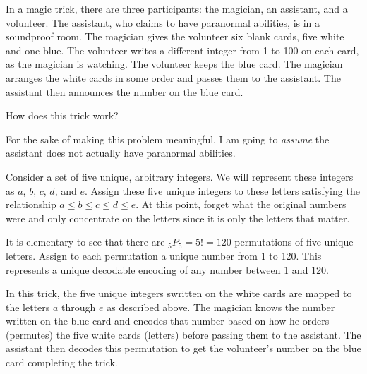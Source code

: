 \newpage
\begin{problem}{15}{5}
  In a magic trick, there are three participants: the magician, an assistant, and a volunteer.  The assistant, who claims to have paranormal abilities, is in a soundproof room.  The magician gives the volunteer six blank cards, five white and one blue.  The volunteer writes a different integer from 1 to 100 on each card, as the magician is watching.  The volunteer keeps the blue card. The magician arranges the white cards in some order and passes them to the assistant. The assistant then announces the number on the blue card.
  
  How does this trick work?
\end{problem}

For the sake of making this problem meaningful, I am going to \textit{assume} the assistant does not actually have paranormal abilities.

Consider a set of five unique, arbitrary integers.  We will represent these integers as $a$, $b$, $c$, $d$, and $e$.  Assign these five unique integers to these letters satisfying the relationship $a \leq b \leq c \leq d \leq e$.  At this point, forget what the original numbers were and only concentrate on the letters since it is only the letters that matter.  

It is elementary to see that there are ${}_{5}P_{5} = 5! = 120$ permutations of five unique letters.  Assign to each permutation a unique number from 1 to 120.  This represents a unique decodable encoding of any number between 1 and 120.

In this trick, the five unique integers swritten on the white cards are mapped to the letters $a$ through $e$ as described above.  The magician knows the number written on the blue card and encodes that number based on how he orders (permutes) the five white cards (letters) before passing them to the assistant.  The assistant then decodes this permutation to get the volunteer's number on the blue card completing the trick.

